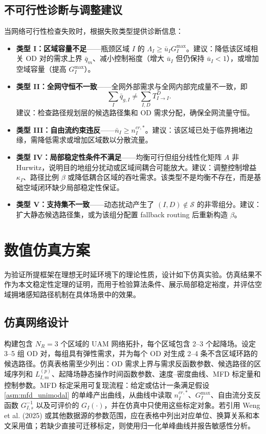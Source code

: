 \documentclass[a4paper,12pt]{article}
\theoremstyle{plain}
\theoremstyle{definition}
\theoremstyle{remark}
\begin{document}
\subsection{不可行性诊断与调整建议}

当网络可行性检查失败时，根据失败类型提供诊断信息：
\begin{itemize}
    \item \textbf{类型 I：区域容量不足}——瓶颈区域 $I$ 的 $\Lambda_I \ge \bar u_I G_I^{\max}$。建议：降低该区域相关 OD 对的需求上界 $\bar{q}_m$、减小控制裕度（增大 $\bar u_I$ 但仍保持 $\bar u_I<1$），或增加空域容量（提高 $G_I^{\max}$）。
    \item \textbf{类型 II：全网守恒不一致}——全网外部需求与全网内部完成量不一致，即
    \begin{equation}
        \sum_I \bar{q}_{g,I} \ne \sum_{I,D} T_{I \to I}^D .
    \end{equation}
    建议：检查路径规划层的候选路径集和 OD 需求分配，确保全网流量守恒。
    \item \textbf{类型 III：自由流约束违反}——$\bar{n}_I \ge n_I^{cr,*}$。建议：该区域已处于临界拥堵边缘，需降低需求或增加区域数以分散流量。
    \item \textbf{类型 IV：局部稳定性条件不满足}——均衡可行但组分线性化矩阵 $A$ 非 Hurwitz，说明目的地组分扰动或区域间耦合可能放大。建议：调整控制增益 $\kappa_I$、路径比例 $\beta$ 或降低耦合区域的吞吐需求。该类型不是均衡不存在，而是基础空域闭环缺少局部稳定性保证。
    \item \textbf{类型 V：支持集不一致}——动态扰动产生了 $(I,D)\notin\mathcal S$ 的非零组分。建议：扩大静态候选路径集，或为该组分配置 fallback routing 后重新构造 $\beta$。
\end{itemize}

\section{数值仿真方案}

为验证所提框架在理想无时延环境下的理论性质，设计如下仿真实验。仿真结果不作为本文稳定性定理的证明，而用于检验算法条件、展示局部稳定裕度，并评估空域拥堵感知路径机制在具体场景中的效果。

\subsection{仿真网络设计}
构建包含 $N_R = 3$ 个区域的 UAM 网络拓扑，每个区域包含 2--3 个起降场。设定 3--5 组 OD 对，每组具有弹性需求，并为每个 OD 对生成 2--4 条不含区域环路的候选路径。仿真表格需至少列出：OD 需求上界与需求反函数参数、候选路径的区域序列和 $L_{I,m}^{(p)}$、起降场静态操作时间函数参数、速度--密度曲线、MFD 标定量和控制参数。MFD 标定采用可复现流程：给定或估计一条满足假设 \ref{asm:mfd_unimodal} 的单峰产出曲线，从曲线中读取 $n_I^{cr,*}$、$G_I^{\max}$、自由流分支反函数 $G_{I,s}^{-1}$ 以及可评价的 $G_I(\cdot)$，并在仿真中只使用这些标定对象。若引用 Weng et al. (2025) 或其他数据源的参数范围，应在表格中列出对应单位、换算关系和本文采用值；若缺少直接可迁移标定，则使用归一化单峰曲线并报告敏感性分析。
\end{document}
